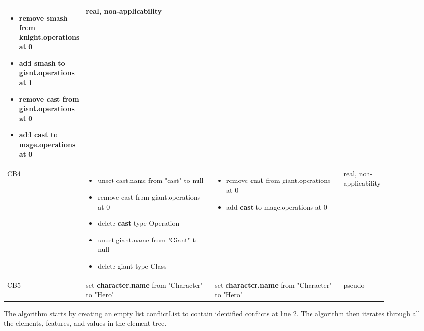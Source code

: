 \begin{table}[ht]
\begin{tabular}{|p{0.04\linewidth}|p{0.38\linewidth}|p{0.38\linewidth}|
        p{0.1\linewidth}|}
\begin{minipage}[t]{\linewidth}
\begin{itemize}[leftmargin=0pt]
          \setlength
          \item[] remove smash from knight.operations at 0
          \item[] add smash to \textbf{giant}.operations at 1
          \item[] remove cast from \textbf{giant}.operations at 0
          \item[] add cast to mage.operations at 0
        \end{itemize}
      \end{minipage}
      & 
      real, non-applicability\\
      \hline
      CB4 & 
      \begin{minipage}[t]{\linewidth}
        \raggedright
        \begin{itemize}[leftmargin=0pt]
          \setlength
          \item[] unset cast.name from "cast" to null
          \item[] remove cast from giant.operations at 0
          \item[] delete \textbf{cast} type Operation
          \item[] unset giant.name from "Giant" to null
          \item[] delete giant type Class
        \end{itemize}
      \end{minipage}
      & 
      \begin{minipage}[t]{\linewidth}
        \raggedright
        \begin{itemize}[leftmargin=0pt]
          \setlength
          \item[] remove \textbf{cast} from giant.operations at 0
          \item[] add \textbf{cast} to mage.operations at 0
        \end{itemize}
      \end{minipage}
      & 
      real, non-applicability\\
      \hline
      CB5 & 
      set \textbf{character.name} from "Character" to "Hero" & 
      set \textbf{character.name} from "Character" to "Hero" & 
      pseudo\\ 
      \hline
    \end{tabular}
\end{table}


The algorithm starts by creating an empty list \textsf{conflictList} to contain identified conflicts at line 2. The algorithm then iterates through all the elements, features, and values in the element tree. 

